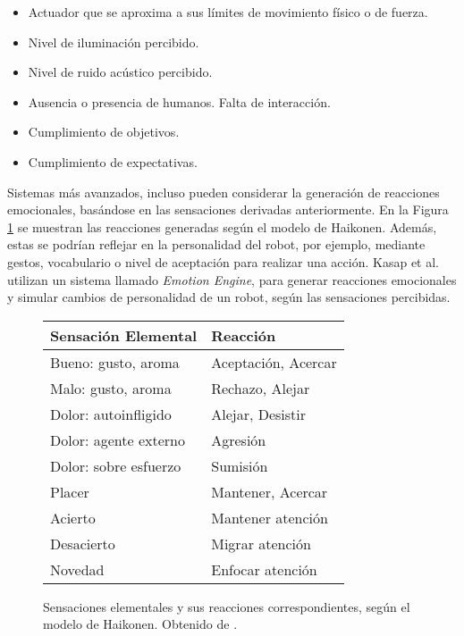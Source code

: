 \begin{itemize}[topsep=0pt]
	\setlength\itemsep{0.2em}
	\item Actuador que se aproxima a sus límites de movimiento físico o de fuerza. 
	\item Nivel de iluminación percibido.
	\item Nivel de ruido acústico percibido.
	\item Ausencia o presencia de humanos. Falta de interacción.
	\item Cumplimiento de objetivos.
	\item Cumplimiento de expectativas.
\end{itemize}


Sistemas más avanzados, incluso pueden considerar la generación de reacciones emocionales, basándose en las sensaciones derivadas anteriormente. En la Figura \ref{img:emotional_haikonen} se muestran las reacciones generadas según el modelo de Haikonen. Además, estas se podrían reflejar en la personalidad del robot, por ejemplo, mediante gestos, vocabulario o nivel de aceptación para realizar una acción. Kasap et al. \cite{Kasap2010} utilizan un sistema llamado \textit{Emotion Engine}, para generar reacciones emocionales y simular cambios de personalidad de un robot, según las sensaciones percibidas.

\begin{figure}[!h]
	\centering
	\begin{tabular}{| l | l |}
		\hline
		\rowcolor{gray!50}
		Sensación Elemental & Reacción  \\ 
		\hline Bueno: gusto, aroma & Aceptación, Acercar \\ 
		\hline Malo: gusto, aroma & Rechazo, Alejar \\ 
		\hline Dolor: autoinfligido  & Alejar, Desistir \\ 
		\hline Dolor: agente externo & Agresión \\ 
		\hline Dolor: sobre esfuerzo & Sumisión \\ 
		\hline Placer & Mantener, Acercar \\ 
		\hline Acierto & Mantener atención \\ 
		\hline Desacierto & Migrar atención \\ 
		\hline Novedad & Enfocar atención \\ 
		\hline 
	\end{tabular} 
	\caption{\small Sensaciones elementales y sus reacciones correspondientes, según el modelo de Haikonen. Obtenido de \cite{Dodd2005}.}
	\label{img:emotional_haikonen}
\end{figure}


